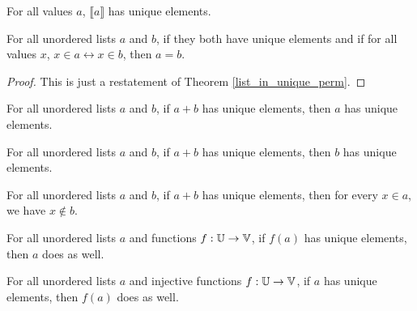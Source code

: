 \documentclass[../math.tex]{subfiles}
\begin{document}
\begin{theorem}
    For all values $a$, $\llbracket a\rrbracket$ has unique elements.
\end{theorem}

\begin{theorem} \label{ulist_in_unique_eq}
    For all unordered lists $a$ and $b$, if they both have unique elements and
    if for all values $x$, $x \in a \leftrightarrow x \in b$, then $a = b$.
\end{theorem}
\begin{proof}
    This is just a restatement of Theorem \ref{list_in_unique_perm}.
\end{proof}

\begin{theorem} \label{ulist_unique_lconc}
    For all unordered lists $a$ and $b$, if $a + b$ has unique elements, then
    $a$ has unique elements.
\end{theorem}

\begin{theorem} \label{ulist_unique_rconc}
    For all unordered lists $a$ and $b$, if $a + b$ has unique elements, then
    $b$ has unique elements.
\end{theorem}

\begin{theorem} \label{ulist_unique_conc}
    For all unordered lists $a$ and $b$, if $a + b$ has unique elements, then
    for every $x \in a$, we have $x \notin b$.
\end{theorem}

\begin{theorem} \label{ulist_image_unique}
    For all unordered lists $a$ and functions $f : \mathbb{U} \to \mathbb{V}$, if $f(a)$ has
    unique elements, then $a$ does as well.
\end{theorem}

\begin{theorem} \label{ulist_image_unique_inj}
    For all unordered lists $a$ and injective functions $f : \mathbb{U} \to \mathbb{V}$, if $a$
    has unique elements, then $f(a)$ does as well.
\end{theorem}
\end{document}

